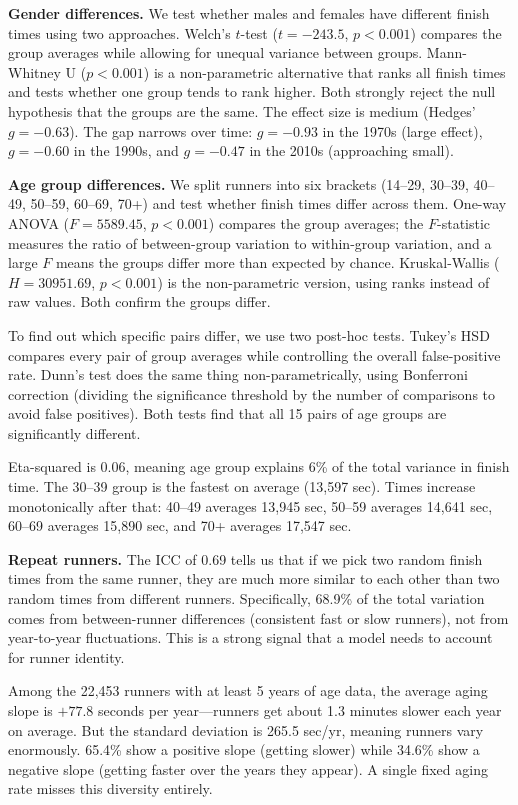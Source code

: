 \documentclass[conference]{IEEEtran}
\begin{document}
\textbf{Gender differences.} We test whether males and females have different finish times using two approaches. Welch's $t$-test ($t = -243.5$, $p < 0.001$) compares the group averages while allowing for unequal variance between groups. Mann-Whitney U ($p < 0.001$) is a non-parametric alternative that ranks all finish times and tests whether one group tends to rank higher. Both strongly reject the null hypothesis that the groups are the same. The effect size is medium (Hedges' $g = -0.63$). The gap narrows over time: $g = -0.93$ in the 1970s (large effect), $g = -0.60$ in the 1990s, and $g = -0.47$ in the 2010s (approaching small).

\textbf{Age group differences.} We split runners into six brackets (14--29, 30--39, 40--49, 50--59, 60--69, 70+) and test whether finish times differ across them. One-way ANOVA ($F = 5589.45$, $p < 0.001$) compares the group averages; the $F$-statistic measures the ratio of between-group variation to within-group variation, and a large $F$ means the groups differ more than expected by chance. Kruskal-Wallis ($H = 30951.69$, $p < 0.001$) is the non-parametric version, using ranks instead of raw values. Both confirm the groups differ.

To find out which specific pairs differ, we use two post-hoc tests. Tukey's HSD compares every pair of group averages while controlling the overall false-positive rate. Dunn's test does the same thing non-parametrically, using Bonferroni correction (dividing the significance threshold by the number of comparisons to avoid false positives). Both tests find that all 15 pairs of age groups are significantly different.

Eta-squared is 0.06, meaning age group explains 6\% of the total variance in finish time. The 30--39 group is the fastest on average (13,597 sec). Times increase monotonically after that: 40--49 averages 13,945 sec, 50--59 averages 14,641 sec, 60--69 averages 15,890 sec, and 70+ averages 17,547 sec.

\textbf{Repeat runners.} The ICC of 0.69 tells us that if we pick two random finish times from the same runner, they are much more similar to each other than two random times from different runners. Specifically, 68.9\% of the total variation comes from between-runner differences (consistent fast or slow runners), not from year-to-year fluctuations. This is a strong signal that a model needs to account for runner identity.

Among the 22,453 runners with at least 5 years of age data, the average aging slope is $+77.8$ seconds per year---runners get about 1.3 minutes slower each year on average. But the standard deviation is 265.5 sec/yr, meaning runners vary enormously. 65.4\% show a positive slope (getting slower) while 34.6\% show a negative slope (getting faster over the years they appear). A single fixed aging rate misses this diversity entirely.
\end{document}
